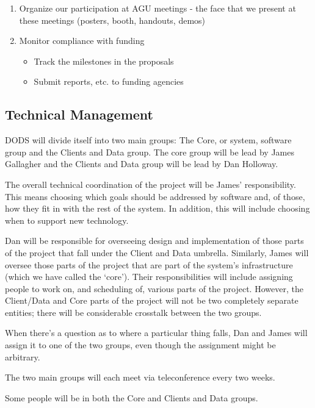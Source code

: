 \documentclass{article}
\begin{document}
\begin{enumerate}
\item Organize our participation at AGU meetings - the face that we
  present at these meetings (posters, booth, handouts, demos)

\item Monitor compliance with funding

  \begin{itemize}
  \item Track the milestones in the proposals
  \item Submit reports, etc. to funding agencies
  \end{itemize}

\end{enumerate}

\subsection*{Technical Management}
  DODS will divide itself into two main groups: The Core, or system, software
  group and the Clients and Data group. The core group will be lead by James
  Gallagher and the Clients and Data group will be lead by Dan Holloway.
  
  The overall technical coordination of the project will be James'
  responsibility. This means choosing which goals should be addressed by
  software and, of those, how they fit in with the rest of the system. In
  addition, this will include choosing when to support new technology.
  
  Dan will be responsible for overseeing design and implementation of those
  parts of the project that fall under the Client and Data umbrella.
  Similarly, James will oversee those parts of the project that are part of
  the system's infrastructure (which we have called the `core').  Their
  responsibilities will include assigning people to work on, and scheduling
  of, various parts of the project. However, the Client/Data and Core parts of
  the project will not be two completely separate entities; there will be
  considerable crosstalk between the two groups.
  
  When there's a question as to where a particular thing falls, Dan and James
  will assign it to one of the two groups, even though the assignment might
  be arbitrary.

  The two main groups will each meet via teleconference every two weeks.
  
  Some people will be in both the Core and Clients and Data groups.
\end{document}
